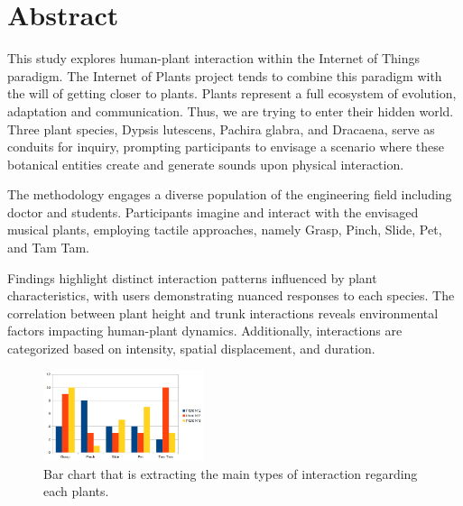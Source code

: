 \section*{Abstract}
\begin{textbf}


This study explores human-plant interaction within the Internet of Things paradigm. The Internet of Plants project tends to combine this paradigm with the will of getting closer to plants. Plants represent a full ecosystem of evolution, adaptation and communication. Thus, we are trying to enter their hidden world. Three plant species, Dypsis lutescens, Pachira glabra, and Dracaena, serve as conduits for inquiry, prompting participants to envisage a scenario where these botanical entities create and generate sounds upon physical interaction.

The methodology engages a diverse population of the engineering field including doctor and students. Participants imagine and interact with the envisaged musical plants, employing tactile approaches, namely Grasp, Pinch, Slide, Pet, and Tam Tam.

Findings highlight distinct interaction patterns influenced by plant characteristics, with users demonstrating nuanced responses to each species. The correlation between plant height and trunk interactions reveals environmental factors impacting human-plant dynamics. Additionally, interactions are categorized based on intensity, spatial displacement, and duration.

\end{textbf}

\begin{figure}[ht]
    \centering
    \includegraphics[width=0.42\textwidth]{Images/plant_interaction_chart.png}
    \caption{Bar chart that is extracting the main types of interaction regarding each plants.}
    
    \vspace{-0.5cm}
    \label{fig:setup_user_study}
    \vspace{0.2cm}
\end{figure}

\newpage
